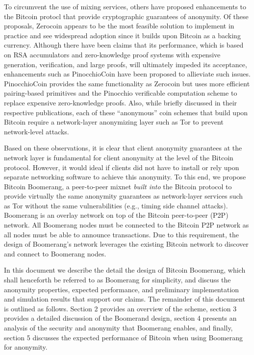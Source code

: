 To circumvent the use of mixing services, others have proposed enhancements to the Bitcoin protocl that provide cryptographic guarantees of anonymity. Of these proposals, Zerocoin \cite{zerocoin} appears to be the most feasible solution to implement in practice and see widespread adoption since it builds upon Bitcoin as a backing currency. Although there have been claims that its performance, which is based on RSA accumulators and zero-knowledge proof systems with expensive generation, verification, and large proofs, will ultimately impeded its acceptance, enhancements such as PinocchioCoin \cite{pinocchio} have been proposed to allieviate such issues. PinocchioCoin provides the same functionality as Zerocoin but uses more efficient pairing-based primitives and the Pinocchio verificable computation scheme to replace expensive zero-knowledge proofs. Also, while briefly discussed in their respective publications, each of these ``anonymous'' coin schemes that build upon Bitcoin require a network-layer anonymizing layer such as Tor to prevent network-level attacks.

Based on these observations, it is clear that client anonymity guarantees at the network layer is fundamental for client anonymity at the level of the Bitcoin protocol. However, it would ideal if clients did not have to install or rely upon separate networking software to achieve this anonymity. To this end, we propose Bitcoin Boomerang, a peer-to-peer mixnet \emph{built into} the Bitcoin protocol to provide virtually the same anonymity guarantees as network-layer services such as Tor without the same vulnerabilities (e.g., timing side channel attacks). Boomerang is an overlay network on top of the Bitcoin peer-to-peer (P2P) network. All Boomerang nodes must be connected to the Bitcoin P2P network as all nodes must be able to announce transactions. Due to this requirement, the design of Boomerang’s network leverages the existing Bitcoin network to discover and connect to Boomerang nodes.

In this document we describe the detail the design of Bitcoin Boomerang, which shall henceforth be referred to as Boomerang for simplicity, and discuss the anonymity properties, expected performance, and preliminary implementation and simulation results that support our claims. The remainder of this document is outlined as follows. Section 2 provides an overview of the scheme, section 3 provides a detailed discussion of the Boomerand design, section 4 presents an analysis of the security and anonymity that Boomerang enables, and finally, section 5 discusses the expected performance of Bitcoin when using Boomerang for anonymity. 



